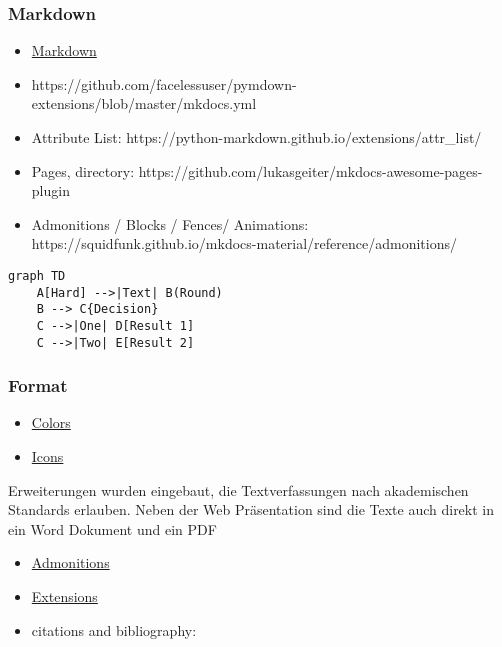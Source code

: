\hypertarget{markdown}{%
\subsubsection{Markdown}\label{markdown}}

\begin{itemize}
\tightlist
\item
  \href{https://facelessuser.github.io/PyMdown/user-guide/markdown-syntax/}{Markdown}
\item
  https://github.com/facelessuser/pymdown-extensions/blob/master/mkdocs.yml
\item
  Attribute List:
  https://python-markdown.github.io/extensions/attr\_list/
\item
  Pages, directory:
  https://github.com/lukasgeiter/mkdocs-awesome-pages-plugin
\item
  Admonitions / Blocks / Fences/ Animations:
  https://squidfunk.github.io/mkdocs-material/reference/admonitions/
\end{itemize}

\begin{verbatim}
graph TD
    A[Hard] -->|Text| B(Round)
    B --> C{Decision}
    C -->|One| D[Result 1]
    C -->|Two| E[Result 2]
\end{verbatim}

\hypertarget{format}{%
\subsubsection{Format}\label{format}}

\begin{itemize}
\tightlist
\item
  \href{https://squidfunk.github.io/mkdocs-material/setup/changing-the-colors/}{Colors}
\item
  \href{https://squidfunk.github.io/mkdocs-material/setup/changing-the-logo-and-icons/}{Icons}
\end{itemize}

Erweiterungen wurden eingebaut, die Textverfassungen nach akademischen
Standards erlauben. Neben der Web Präsentation sind die Texte auch
direkt in ein Word Dokument und ein PDF

\begin{itemize}
\item
  \href{https://squidfunk.github.io/mkdocs-material/reference/admonitions/}{Admonitions}
\item
  \href{https://facelessuser.github.io/pymdown-extensions/extensions/smartsymbols/}{Extensions}
\item
  citations and bibliography:
\end{itemize}

